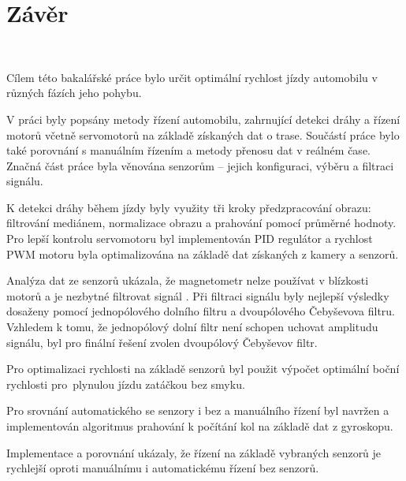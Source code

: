 \chapter{Závěr}
\label{sec:End}
\

Cílem této bakalářské práce bylo určit optimální rychlost jízdy automobilu v různých
fázích jeho pohybu.

V práci byly popsány metody řízení automobilu, zahrnující detekci dráhy a řízení
motorů včetně servomotorů na základě získaných dat o trase. Součástí práce bylo také
porovnání s manuálním řízením a metody přenosu dat v reálném čase. Značná část práce
byla věnována senzorům – jejich konfiguraci, výběru a filtraci signálu.

K detekci dráhy během jízdy byly využity tři kroky předzpracování obrazu: filtrování
mediánem, normalizace obrazu a prahování pomocí průměrné hodnoty. Pro lepší kontrolu
servomotoru byl implementován PID regulátor a rychlost PWM motoru byla optimalizována
na základě dat získaných z kamery a senzorů.

Analýza dat ze senzorů ukázala, že magnetometr nelze používat v blízkosti motorů a je
nezbytné filtrovat signál . Při filtraci signálu byly nejlepší výsledky dosaženy
pomocí jednopólového dolního filtru a dvoupólového Čebyševova filtru. Vzhledem k tomu,
že jednopólový dolní filtr není schopen uchovat amplitudu signálu, byl pro finální
řešení zvolen dvoupólový Čebyševov filtr.

Pro optimalizaci rychlosti na základě senzorů byl použit výpočet optimální boční
rychlosti pro~plynulou jízdu zatáčkou bez smyku.

Pro srovnání automatického se senzory i bez a manuálního řízení byl navržen a implementován algoritmus
prahování k počítání kol na základě dat z gyroskopu.

Implementace a porovnání ukázaly, že řízení na základě vybraných senzorů je rychlejší
oproti manuálnímu i automatickému řízení bez senzorů.

\endinput
